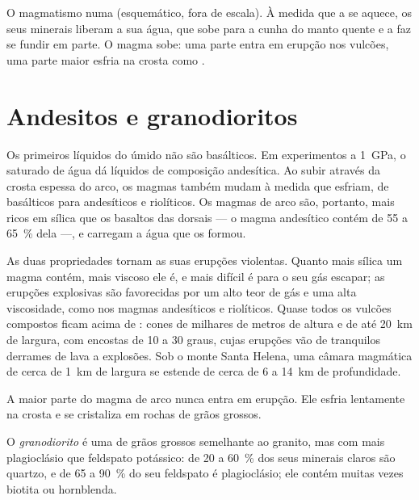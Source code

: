 \begin{omfigure}
{\small O magmatismo numa  (esquemático, fora de escala).
À medida que a  se aquece, os seus minerais liberam a sua água, que sobe
para a cunha do manto quente e a faz se fundir em parte. O magma sobe: uma
parte entra em erupção nos vulcões, uma parte maior esfria na crosta como
.}
\end{omfigure}

\section{Andesitos e granodioritos}

Os primeiros líquidos do  úmido não são basálticos. Em
experimentos a \qty{1}{GPa}, o  saturado de água dá líquidos de
composição andesítica. Ao subir através da crosta espessa do arco, os magmas
também mudam à medida que esfriam, de basálticos para andesíticos e
riolíticos. Os magmas de arco são, portanto, mais ricos em sílica que os
basaltos das dorsais --- o magma andesítico contém de 55 a
\qty{65}{\percent} dela ---, e carregam a água que os formou.

As duas propriedades tornam as suas erupções violentas. Quanto mais sílica
um magma contém, mais viscoso ele é, e mais difícil é para o seu gás
escapar; as erupções explosivas são favorecidas por um alto teor de gás e
uma alta viscosidade, como nos magmas andesíticos e riolíticos. Quase todos
os vulcões compostos ficam acima de : cones de milhares de
metros de altura e de até \qty{20}{km} de largura, com encostas de 10 a 30
graus, cujas erupções vão de tranquilos derrames de lava a explosões. Sob o
monte Santa Helena, uma câmara magmática de cerca de \qty{1}{km} de largura
se estende de cerca de 6 a \qty{14}{km} de profundidade.

A maior parte do magma de arco nunca entra em erupção. Ele esfria lentamente
na crosta e se cristaliza em rochas de grãos grossos.

\begin{definition}[Granodiorito]\label{def:g12:subduction-magmatism:granodiorite}
O \emph{granodiorito} é uma  de grãos
grossos semelhante ao granito, mas com mais plagioclásio que feldspato
potássico: de 20 a \qty{60}{\percent} dos seus minerais claros são quartzo,
e de 65 a \qty{90}{\percent} do seu feldspato é plagioclásio; ele contém
muitas vezes biotita ou hornblenda.
\end{definition}

